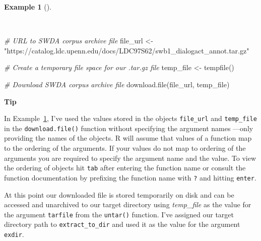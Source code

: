 \documentclass[
  letterpaper,
  krantz1]{latex/krantz-mod}
\newenvironment{Shaded}{\begin{snugshade}}{\end{snugshade}}
\newcommand{\CommentTok}[1]{\textcolor[rgb]{0.00,0.00,0.00}{\textit{#1}}}
\newcommand{\FunctionTok}[1]{\textcolor[rgb]{0.00,0.00,0.00}{#1}}
\newcommand{\NormalTok}[1]{\textcolor[rgb]{0.00,0.00,0.00}{#1}}
\newcommand{\OtherTok}[1]{\textcolor[rgb]{0.00,0.00,0.00}{#1}}
\newcommand{\StringTok}[1]{\textcolor[rgb]{0.00,0.00,0.00}{#1}}
\theoremstyle{definition}
\theoremstyle{definition}
\newtheorem{example}{Example}[chapter]
\theoremstyle{remark}
\begin{document}
\begin{example}[]\protect\hypertarget{exm-acquire-swda-temp-file}{}\label{exm-acquire-swda-temp-file}

~

\begin{Shaded}
\begin{Highlighting}[numbers=left,,]
\CommentTok{\# URL to SWDA corpus archive file}
\NormalTok{file\_url }\OtherTok{\textless{}{-}}
  \StringTok{"https://catalog.ldc.upenn.edu/docs/LDC97S62/swb1\_dialogact\_annot.tar.gz"}

\CommentTok{\# Create a temporary file space for our .tar.gz file}
\NormalTok{temp\_file }\OtherTok{\textless{}{-}} \FunctionTok{tempfile}\NormalTok{()}

\CommentTok{\# Download SWDA corpus archive file}
\FunctionTok{download.file}\NormalTok{(file\_url, temp\_file)}
\end{Highlighting}
\end{Shaded}

\end{example}

\begin{tcolorbox}[enhanced jigsaw, toprule=.15mm, breakable, colback=white, arc=.35mm, left=2mm, colframe=quarto-callout-color-frame, opacityback=0, bottomrule=.15mm, rightrule=.15mm, leftrule=.75mm]

\textbf{ Tip}

In Example~\ref{exm-acquire-swda-temp-file}, I've used the values stored
in the objects \texttt{file\_url} and \texttt{temp\_file} in the
\texttt{download.file()} function without specifying the argument names
---only providing the names of the objects. R will assume that values of
a function map to the ordering of the arguments. If your values do not
map to ordering of the arguments you are required to specify the
argument name and the value. To view the ordering of objects hit
\texttt{tab} after entering the function name or consult the function
documentation by prefixing the function name with \texttt{?} and hitting
\texttt{enter}.

\end{tcolorbox}

At this point our downloaded file is stored temporarily on disk and can
be accessed and unarchived to our target directory using
\emph{temp\_file} as the value for the argument \texttt{tarfile} from
the \texttt{untar()} function. I've assigned our target directory path
to \texttt{extract\_to\_dir} and used it as the value for the argument
\texttt{exdir}.
\end{document}
